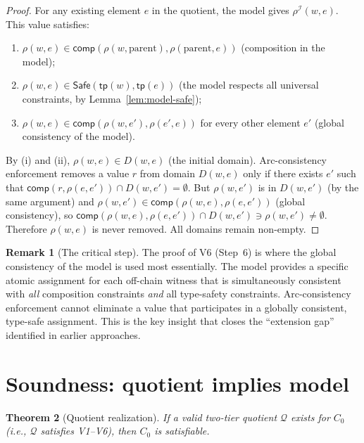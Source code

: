\documentclass[a4paper,11pt]{article}
\newtheorem{theorem}{Theorem}[section]
\theoremstyle{definition}
\newtheorem{remark}[theorem]{Remark}
\newcommand{\comp}{\ensuremath{\mathsf{comp}}}
\newcommand{\tp}{\ensuremath{\mathsf{tp}}}
\newcommand{\Safe}{\ensuremath{\mathsf{Safe}}}
\newcommand{\interp}{\ensuremath{\mathcal{I}}}
\begin{document}
\begin{proof}
For any existing element $e$ in the quotient, the model gives
$\rho^{\interp}(w, e)$.  This value satisfies:
\begin{enumerate}[label=(\roman*)]
\item $\rho(w, e) \in \comp(\rho(w, \text{parent}),
  \rho(\text{parent}, e))$ (composition in the model);
\item $\rho(w, e) \in \Safe(\tp(w), \tp(e))$ (the model respects
  all universal constraints, by Lemma~\ref{lem:model-safe});
\item $\rho(w, e) \in \comp(\rho(w, e'), \rho(e', e))$ for every
  other element $e'$ (global consistency of the model).
\end{enumerate}

By (i) and (ii), $\rho(w, e) \in D(w, e)$ (the initial domain).
Arc-consistency enforcement removes a value $r$ from domain $D(w, e)$
only if there exists $e'$ such that $\comp(r, \rho(e, e')) \cap
D(w, e') = \emptyset$.  But $\rho(w, e')$ is in $D(w, e')$
(by the same argument) and $\rho(w, e') \in \comp(\rho(w, e),
\rho(e, e'))$ (global consistency), so $\comp(\rho(w, e), \rho(e,
e')) \cap D(w, e') \ni \rho(w, e') \ne \emptyset$.  Therefore
$\rho(w, e)$ is never removed.  All domains remain non-empty.
\end{proof}

\begin{remark}[The critical step]
The proof of V6 (Step~6) is where the global consistency of the
model is used most essentially.  The model provides a specific
atomic assignment for each off-chain witness that is simultaneously
consistent with \emph{all} composition constraints \emph{and} all
type-safety constraints.  Arc-consistency
enforcement cannot eliminate a value that participates in a globally
consistent, type-safe assignment.  This is the key insight that closes
the ``extension gap'' identified in earlier approaches.
\end{remark}


\section{Soundness: quotient implies model}\label{sec:soundness}

\begin{theorem}[Quotient realization]\label{thm:soundness}
If a valid two-tier quotient $\mathcal{Q}$ exists for $C_0$ (i.e.,
$\mathcal{Q}$ satisfies V1--V6), then $C_0$ is satisfiable.
\end{theorem}
\end{document}
